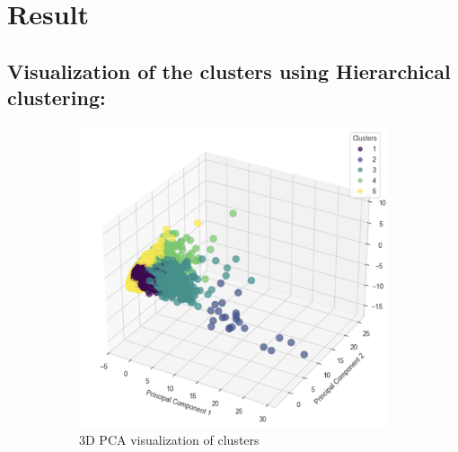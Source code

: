 \section{Result}

\subsection{Visualization of the clusters using Hierarchical clustering:}
\begin{figure}[H]
    \centering
    \begin{subfigure}[b]{0.45\textwidth}
        \centering
        \includegraphics[width=\textwidth]{src/figs/3d_PCA_HC.png}
        \caption{3D PCA visualization of clusters}
        \label{fig:3D_pca}
    \end{subfigure}
    \hfill
    \begin{subfigure}[b]{0.45\textwidth}
        \centering

\end{subfigure}
\end{figure}
